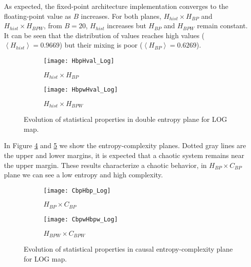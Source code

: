 As expected, the fixed-point architecture implementation converges to the floating-point value as $B$ increases.
For both planes, $H_{hist} \times H_{BP}$ and $H_{hist} \times H_{BPW}$, from $B=20$, $H_{hist}$ increases but $H_{BP}$ and $H_{BPW}$ remain constant.
It can be seen that the distribution of values reaches high values ($\left\langle H_{hist}\right\rangle =0.9669$) but their mixing is poor ($\left\langle H_{BP}\right\rangle =0.6269$).
%
\begin{figure}[H]
	\centering
	\begin{subfigure}[b]{0.49\textwidth}
		\texttt{[image: HbpHval\_Log]}
		\caption{$H_{hist} \times H_{BP}$}
		\label{fig:HbpHval_Log}
	\end{subfigure}
	\begin{subfigure}[b]{0.49\textwidth}
		\texttt{[image: HbpwHval\_Log]}
		\caption{$H_{hist} \times H_{BPW}$}
		\label{fig:HbpwHval_Log}
	\end{subfigure}
	\caption{Evolution of statistical properties in double entropy plane for LOG map.}
	\label{fig:LOG_HH}
\end{figure}

In Figure \ref{fig:CbpHbp_Log} and \ref{fig:CbpwHbpw_Log} we show the entropy-complexity planes.
Dotted gray lines are the upper and lower margins, it is expected that a chaotic system remains near the upper margin.
These results characterize a chaotic behavior, in $H_{BP} \times C_{BP}$ plane we can see a low entropy and high complexity.
%
\begin{figure}[H]
	\centering
	\begin{subfigure}[b]{0.49\textwidth}
		\texttt{[image: CbpHbp\_Log]}
		\caption{$H_{BP} \times C_{BP}$}
		\label{fig:CbpHbp_Log}
	\end{subfigure}
	\begin{subfigure}[b]{0.49\textwidth}
		\texttt{[image: CbpwHbpw\_Log]}
		\caption{$H_{BPW} \times C_{BPW}$}
		\label{fig:CbpwHbpw_Log}
	\end{subfigure}
	\caption{Evolution of statistical properties in causal entropy-complexity plane for LOG map.}
	\label{fig:LOG_HC}
\end{figure}
